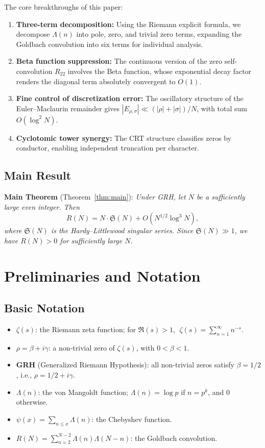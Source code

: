 \documentclass[11pt,a4paper]{article}
\theoremstyle{remark}
\begin{document}
The core breakthroughs of this paper:
\begin{enumerate}
\item \textbf{Three-term decomposition:} Using the Riemann explicit formula, we decompose $\Lambda(n)$ into pole, zero, and trivial zero terms, expanding the Goldbach convolution into six terms for individual analysis.
\item \textbf{Beta function suppression:} The continuous version of the zero self-convolution $R_{22}$ involves the Beta function, whose exponential decay factor renders the diagonal term absolutely convergent to $O(1)$.
\item \textbf{Fine control of discretization error:} The oscillatory structure of the Euler--Maclaurin remainder gives $|E_{\rho,\sigma}| \ll (|\rho|+|\sigma|)/N$, with total sum $O(\log^2 N)$.
\item \textbf{Cyclotomic tower synergy:} The CRT structure classifies zeros by conductor, enabling independent truncation per character.
\end{enumerate}

\subsection{Main Result}

\textbf{Main Theorem} (Theorem~\ref{thm:main}): \emph{Under GRH, let $N$ be a sufficiently large even integer. Then}
\begin{equation}
R(N) = N \cdot \mathfrak{S}(N) + O(N^{1/2}\log^3 N),
\end{equation}
\emph{where $\mathfrak{S}(N)$ is the Hardy--Littlewood singular series. Since $\mathfrak{S}(N) \gg 1$, we have $R(N) > 0$ for sufficiently large $N$.}

\section{Preliminaries and Notation}

\subsection{Basic Notation}

\begin{itemize}
\item $\zeta(s)$: the Riemann zeta function; for $\Re(s) > 1$, $\;\zeta(s) = \sum_{n=1}^\infty n^{-s}$.
\item $\rho = \beta + i\gamma$: a non-trivial zero of $\zeta(s)$, with $0 < \beta < 1$.
\item \textbf{GRH} (Generalized Riemann Hypothesis): all non-trivial zeros satisfy $\beta = 1/2$, i.e., $\rho = 1/2 + i\gamma$.
\item $\Lambda(n)$: the von Mangoldt function; $\Lambda(n) = \log p$ if $n = p^k$, and $0$ otherwise.
\item $\psi(x) = \sum_{n \leq x} \Lambda(n)$: the Chebyshev function.
\item $R(N) = \sum_{n=2}^{N-2} \Lambda(n)\Lambda(N-n)$: the Goldbach convolution.
\end{itemize}
\end{document}
